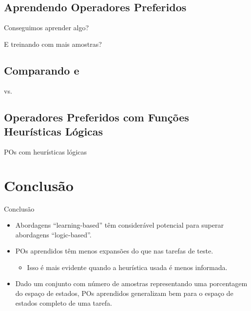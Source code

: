 \documentclass{beamer}
\begin{document}
\subsection{Aprendendo Operadores Preferidos}
\begin{frame}{Conseguimos aprender algo?}

\end{frame}

\begin{frame}{E treinando com mais amostras?}

\end{frame}

\subsection{Comparando \bfsrs e \bfsrw}
\begin{frame}{\bfsrs vs. \bfsrw}

\end{frame}

\subsection{Operadores Preferidos com Funções Heurísticas Lógicas}
\begin{frame}{POs com heurísticas lógicas}
  
\end{frame}


\section{Conclusão}
\begin{frame}{Conclusão}
\begin{itemize}
  \item Abordagens ``learning-based'' têm considerável \alert{potencial} para superar abordagens ``logic-based''.
  \pause
  \item POs aprendidos \pog têm \alert{menos expansões} do que \poff nas tarefas de teste.
  \pause
    \begin{itemize}
      \item Isso é mais evidente quando a heurística usada é menos informada.
    \end{itemize}
  \pause
  \item Dado um conjunto com número de amostras representando uma porcentagem do espaço de estados, POs aprendidos \alert{generalizam bem} para o espaço de estados completo de uma tarefa.
\end{itemize}
\end{frame}
\end{document}

